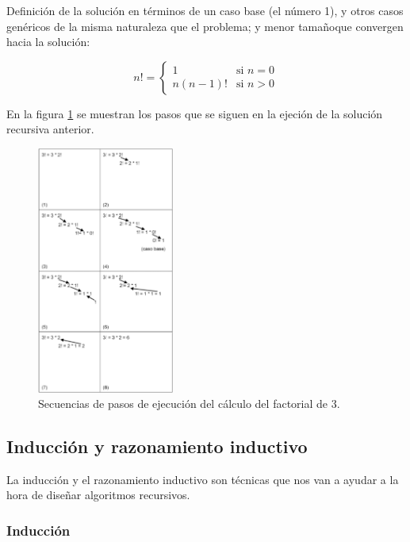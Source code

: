 \documentclass[a4paper, 11pt, titlepage]{article}
\begin{document}
            Definición de la solución en términos de un caso base (el número 1), y otros casos 
            genéricos de la misma naturaleza que el problema; y menor tamañoque convergen hacia la 
            solución:

            \[
            n! = \begin{cases} 
            1 & \mbox{si } n = 0 \\ 
            n (n-1)! & \mbox{si }  n > 0 \end{cases}    
            \]
    
            En la figura \ref{factorial3} se muestran los pasos que se siguen en la ejeción de la solución recursiva 
            anterior.

            \begin{figure}[htp]
                \centering
                \includegraphics[width=0.4\textwidth]{resources/recursividad01.png}
                \caption{Secuencias de pasos de ejecución del cálculo del factorial de 3.}
                \label{factorial3}
            \end{figure}

    \subsection{Inducción y razonamiento inductivo}

        La inducción y el razonamiento inductivo son técnicas que nos van a ayudar a la hora de 
        diseñar algoritmos recursivos.

        \subsubsection{Inducción}
\end{document}

